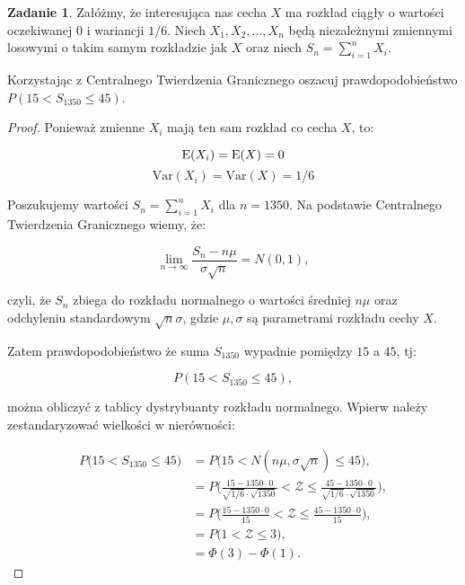 \documentclass[11pt]{article}
\theoremstyle{definition}
\newtheorem{zadanie}{Zadanie}
\begin{document}
\begin{zadanie}
    Załóżmy, że interesująca nas cecha $X$ ma rozkład ciągły o wartości oczekiwanej 0 i wariancji $1/6$. Niech $X_1,X_2, \dots, X_n$
    będą niezależnymi zmiennymi losowymi o takim samym rozkładzie jak $X$ oraz niech
    $S_n = \sum_{i=1}^n X_i$.

    Korzystając z Centralnego Twierdzenia Granicznego oszacuj prawdopodobieństwo $P(15 < S_{1350} \leq 45)$.
\end{zadanie}

\begin{proof}

    Ponieważ zmienne $X_i$ mają ten sam rozkład co cecha $X$, to:

    $$\text E(X_i) = \text E(X) = 0$$
    $$\text{Var}(X_i) = \text{Var}(X) = 1/6$$

    Poszukujemy wartości $S_n = \sum_{i=1}^nX_i$ dla $n=1350$. Na podstawie Centralnego Twierdzenia Granicznego wiemy, że:

    $$\lim_{n \to \infty}\frac{S_n-n\mu}{\sigma\sqrt{n}} = N(0, 1),$$

    czyli, że $S_n$ zbiega do rozkładu normalnego o wartości średniej $n\mu$ oraz odchyleniu standardowym $\sqrt n \sigma$, gdzie $\mu, \sigma$ są parametrami rozkładu cechy $X$.

    Zatem prawdopodobieństwo że suma $S_{1350}$ wypadnie pomiędzy $15$ a $45$, tj:

    $$P(15<S_{1350}\leq 45),$$

    można obliczyć z tablicy dystrybuanty rozkładu normalnego. Wpierw należy zestandaryzować wielkości w nierówności:

    \begin{align*}
        P\Bigg(15<S_{1350}\leq 45\Bigg) & = P\Bigg(15< N(n\mu,\sigma\sqrt{n})\leq 45\Bigg),                                                                                 \\
                                        & = P\Bigg(\frac{15-1350\cdot0}{\sqrt{1/6}\cdot\sqrt{1350}}< \mathcal Z \leq\frac{45-1350\cdot0}{\sqrt{1/6}\cdot\sqrt{1350}}\Bigg), \\
                                        & = P\Bigg(\frac{15-1350\cdot0}{15}<  \mathcal Z  \leq\frac{45-1350\cdot0}{15}\Bigg),                                               \\
                                        & = P\Bigg(1<  \mathcal Z \leq3\Bigg),                                                                                              \\
                                        & = \Phi(3) - \Phi(1).
    \end{align*}


\end{proof}
\end{document}

